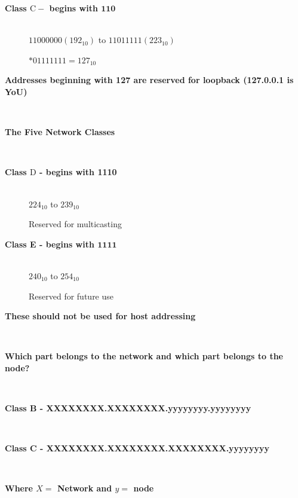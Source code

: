 \begin{description}
\os{\newpage}\item[{\rot\bf  Class $\mathrm{C}-$ begins with $\mathbf{1 1 0}$ }]~\\[-3ex]

\bi
  \ite $11000000\left(192_{10}\right)$ to $11011111\left(223_{10}\right)$
\ei

$* 01111111=127_{10}$


\os{\newpage}\item[{\rot\bf  Addresses beginning with 127 are reserved for loopback (127.0.0.1 is YoU) }]~\\[-3ex]


\os{\newpage}\item[{\rot\bf  The Five Network Classes }]~\\[-3ex]


\os{\newpage}\item[{\rot\bf  Class $\mathrm{D}$ - begins with 1110 }]~\\[-3ex]

\bi
  \ite $224_{10}$ to $239_{10}$

  \ite Reserved for multicasting

\ei


\os{\newpage}\item[{\rot\bf  Class E - begins with $\mathbf{1 1 1 1}$ }]~\\[-3ex]

\bi
  \ite $240_{10}$ to $254_{10}$

  \ite Reserved for future use

\ei


\os{\newpage}\item[{\rot\bf  These should not be used for host addressing }]~\\[-3ex]


\item[{\rot\bf  Which part belongs to the network and which part belongs to the node?  }]~\\[-3ex]



\os{\newpage}\item[{\rot\bf  Class B - XXXXXXXX.XXXXXXXX.yyyyyyyy.yyyyyyyy }]~\\[-3ex]


\os{\newpage}\item[{\rot\bf  Class C - XXXXXXXX.XXXXXXXX.XXXXXXXX.yyyyyyyy }]~\\[-3ex]


\os{\newpage}\item[{\rot\bf  Where $X=$ Network and $y=$ node }]~\\[-3ex]



\end{description}
